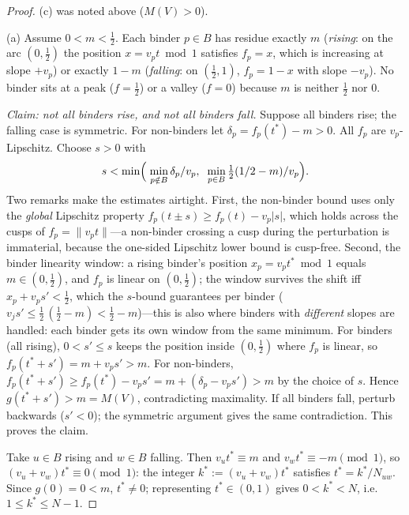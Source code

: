 \documentclass[11pt,a4paper]{article}
\numberwithin{equation}{section}
\theoremstyle{plain}
\theoremstyle{plain}
\theoremstyle{definition}
\theoremstyle{remark}
\newcommand{\wnc}[1]{\lVert #1 \rVert}
\begin{document}
\begin{proof}
(c) was noted above ($M(V)>0$).

(a) Assume $0<m<\tfrac12$. Each binder $p\in B$ has residue exactly $m$
(\emph{rising}: on the arc $(0,\tfrac12)$ the position $x=v_p t\bmod 1$
satisfies $f_p=x$, which is increasing at slope $+v_p$) or exactly $1-m$
(\emph{falling}: on $(\tfrac12,1)$, $f_p=1-x$ with slope $-v_p$). No
binder sits at a peak ($f=\tfrac12$) or a valley ($f=0$) because $m$ is
neither $\tfrac12$ nor $0$.

\emph{Claim: not all binders rise, and not all binders fall.} Suppose all
binders rise; the falling case is symmetric. For non-binders let
$\delta_p=f_p(t^\ast)-m>0$. All $f_p$ are $v_p$-Lipschitz. Choose
$s>0$ with
\[
s<\min\Bigl(\;\min_{p\notin B}\delta_p/v_p,\;\;
                \min_{p\in B}\tfrac{1}{2}(1/2-m)/v_p\Bigr).
\]
Two remarks make the estimates airtight. First, the non-binder bound
uses only the \emph{global} Lipschitz property
$f_p(t\pm s)\ge f_p(t)-v_p|s|$, which holds across the cusps of
$f_p=\wnc{v_pt}$---a non-binder crossing a cusp during the
perturbation is immaterial, because the one-sided Lipschitz lower
bound is cusp-free. Second, the binder linearity window: a rising
binder's position $x_p=v_pt^\ast\bmod 1$ equals $m\in(0,\tfrac12)$,
and $f_p$ is linear on $(0,\tfrac12)$; the window survives the shift
iff $x_p+v_ps'<\tfrac12$, which the $s$-bound guarantees per binder
($v_js'\le\tfrac12\,(\tfrac12-m)<\tfrac12-m$)---this is also where
binders with \emph{different} slopes are handled: each binder gets its
own window from the same minimum.
For binders (all rising), $0<s'\le s$ keeps the position inside
$(0,\tfrac12)$ where $f_p$ is linear, so
$f_p(t^\ast+s')=m+v_p s'>m$. For non-binders,
$f_p(t^\ast+s')\ge f_p(t^\ast)-v_p s'=m+(\delta_p-v_p s')>m$ by the
choice of $s$. Hence $g(t^\ast+s')>m=M(V)$, contradicting maximality. If
all binders fall, perturb backwards ($s'<0$); the symmetric argument gives
the same contradiction. This proves the claim.

Take $u\in B$ rising and $w\in B$ falling. Then
$v_u t^\ast\equiv m$ and $v_w t^\ast\equiv -m \pmod 1$, so
$(v_u+v_w)t^\ast\equiv 0 \pmod 1$: the integer
$k^\ast:=(v_u+v_w)t^\ast$ satisfies $t^\ast=k^\ast/N_{uw}$. Since
$g(0)=0<m$, $t^\ast\ne 0$; representing $t^\ast\in(0,1)$ gives
$0<k^\ast<N$, i.e.\ $1\le k^\ast\le N-1$.

\end{proof}
\end{document}
